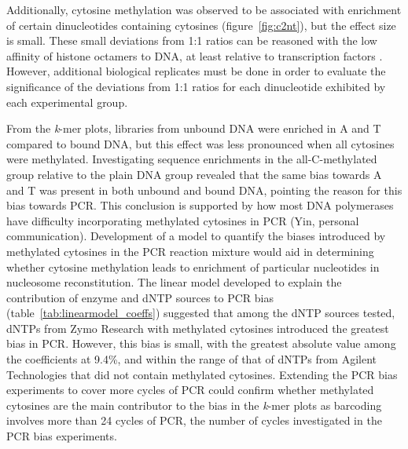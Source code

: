\documentclass[parskip=full, numbers=noenddot]{scrreprt}
\begin{document}
Additionally, cytosine methylation was observed to be associated with enrichment of certain dinucleotides containing cytosines (figure~\ref{fig:c2nt}), but the effect size is small.  These small deviations from 1:1 ratios can be reasoned with the low affinity of histone octamers to DNA, at least relative to transcription factors \citep{struhl_determinants_2013}. %
However, additional biological replicates must be done in order to evaluate the significance of the deviations from 1:1 ratios for each dinucleotide exhibited by each experimental group.


From the \emph{k}-mer plots, libraries from unbound DNA were enriched in A and T compared to bound DNA, but this effect was less pronounced when all cytosines were methylated.  Investigating sequence enrichments in the all-C-methylated group relative to the plain DNA group revealed that the same bias towards A and T was present in both unbound and bound DNA, pointing the reason for this bias towards PCR.  This conclusion is supported by how most DNA polymerases have difficulty incorporating methylated cytosines in PCR (Yin, personal communication). %
Development of a model to quantify the biases introduced by methylated cytosines in the PCR reaction mixture would aid in determining whether cytosine methylation leads to enrichment of particular nucleotides in nucleosome reconstitution.  The linear model developed to explain the contribution of enzyme and dNTP sources to PCR bias (table~\ref{tab:linearmodel_coeffs}) suggested that among the dNTP sources tested, dNTPs from Zymo Research with methylated cytosines introduced the greatest bias in PCR.  However, this bias is small, with the greatest absolute value among the coefficients at 9.4\%, and within the range of that of dNTPs from Agilent Technologies that did not contain methylated cytosines.  Extending the PCR bias experiments to cover more cycles of PCR could confirm whether methylated cytosines are the main contributor to the bias in the \emph{k}-mer plots as barcoding involves more than 24 cycles of PCR, the number of cycles investigated in the PCR bias experiments.
\end{document}

